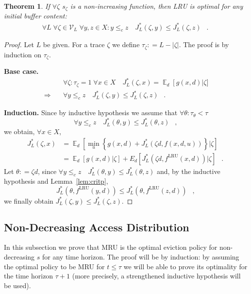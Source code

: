 \documentclass[11pt,a4paper]{article}
\DeclareMathOperator{\E}{\mathbb{E}}
\DeclareMathOperator{\lru}{LRU}
\DeclareMathOperator{\mf}{\enspace .}
\DeclareMathOperator{\mc}{\enspace ,}
\newcommand{\deq}{\mathrel{\mathop:}=}
\newtheorem{theorem}{Theorem}
\theoremstyle{definition}
\theoremstyle{remark}
\begin{document}
\begin{theorem}\label{thm:gener-depend}
  If $\forall \zeta$ $s_\zeta$ is a non-increasing function, then LRU
  is optimal for any initial buffer content:
 \begin{align} 
   \forall L \; \forall \zeta \in \mathcal{V}_L \; \forall y,z \in X : 
   y \leq_c z \quad J_L^*(\zeta,y) \leq J_L^*(\zeta,z) \mf
 \end{align}
\end{theorem}
\begin{proof}
  Let $L$ be given. For a trace $\zeta$ we define $ \tau_\zeta \deq L -
  |\zeta|$. The proof is by induction on $\tau_\zeta$.
  \par{\bf Base case.} 
  \begin{align}
    & \forall \zeta : \tau_\zeta=1 \; \forall x\in X \quad
    J^*_L(\zeta,x)=\E_d\left[g(x,d)\right |\zeta]\\
    \Rightarrow \quad & \forall y \leq_c z \quad J^*_L(\zeta,y) \leq 
    J^*_L(\zeta,z) \mf
  \end{align}
  \par{\bf Induction.}
  Since by inductive hypothesis we assume that $\forall \theta :
  \tau_\theta < \tau$
  \begin{equation}
    \forall y \leq_c z \quad J^*_L(\theta,y) \leq J^*_L(\theta,z) \mc
  \end{equation}
  we obtain, $\forall x \in X$,
  \begin{align}
    J^*_L(\zeta,x) &= \E_d\left[\min_u\left\{g(x,d)+J^*_L\left(\zeta
          d,f(x,d,u)\right)\right\}|\zeta\right]\\
    &= \E_d\left[g(x,d)|\zeta\right] + E_d\left[J^*_L\left(\zeta d,
        f^{\lru}(x,d)\right)|\zeta\right] \mf
  \end{align}
  Let $\theta \deq \zeta d$, since $\forall y \leq_c z \quad
  J^*_L(\theta,y) \leq J^*_L(\theta,z)$ and, by the inductive
  hypothesis and Lemma~\ref{lem:critp},
  \begin{equation}
    J^*_L\left(\theta, f^{\lru}(y,d)\right)
    \leq J^*_L\left(\theta, f^{\lru}(z,d)\right) \mc
  \end{equation}
  we finally obtain $J^*_L(\zeta, y) \leq J^*_L(\zeta, z)$.
\end{proof}



\subsection{Non-Decreasing Access Distribution}
\label{sec:proof-thm.-refmruthm}
In this subsection we prove that MRU is the optimal eviction policy for
non-decreasing $s$ for any time horizon. The proof will be by induction: by
assuming the optimal policy to be MRU for $t\leq \tau$ we will be able to prove
its optimality for the time horizon $\tau+1$ (more precisely, a strengthened
inductive hypothesis will be used).
\end{document}
